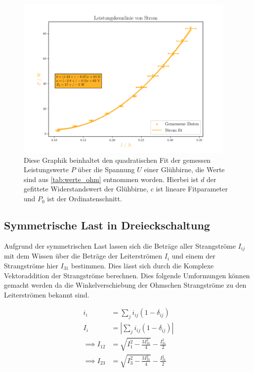 \documentclass[12pt,english,ngerman]{scrartcl}
\begin{document}
\begin{figure}[H]
	\begin{center}
		\includegraphics[width = 0.95\textwidth]{figures/pIkennlinie.pdf}
	\end{center}
	\caption[Stromabhängige Leistungskurve einer Glühbirne]{Diese Graphik beinhaltet den
		quadratischen Fit der gemessen Leistungswerte $P$ über die Spannung $U$ einer
		Glühbirne, die Werte sind aus \autoref{tab:werte_ohm} entnommen worden. Hierbei
		ist $d$ der gefittete Widerstandswert der Glühbirne, $c$ ist lineare
		Fitparameter und $P_0$ ist der Ordinatenschnitt.
	}\label{fig:pIkennlinie}
\end{figure}

\subsection{Symmetrische Last in Dreieckschaltung}\label{sec:ausw_dreieck}

Aufgrund der symmetrischen Last lassen sich die Beträge aller Strangströme
$I_{ij}$ mit dem Wissen über die Beträge der Leiterströmen $I_i$ und einem der
Strangströme hier $I_{31}$ bestimmen. Dies lässt sich durch die Komplexe
Vektoraddition der Strangströme berechnen. Dies folgende Umformungen können
gemacht werden da die Winkelverschiebung der Ohmschen Strangströme zu den
Leiterströmen bekannt sind.

\begin{align}
	i_{i}           & = \sum_{j} i_{ij} (1-\delta_{ij})                                                    \\
	I_{i}           & = |\sum_{j} i_{ij} (1-\delta_{ij})|                                                  \\
	\implies I_{12} & = \sqrt{I_1^2-\frac{3I_{31}^2}{4}}-\frac{I_{31}^2}{2}                                \\
	\implies I_{23} & = \sqrt{I_3^2-\frac{3I_{31}^2}{4}}-\frac{I_{31}^2}{2}\label{eq:complexstromaddition}
\end{align}
\end{document}
